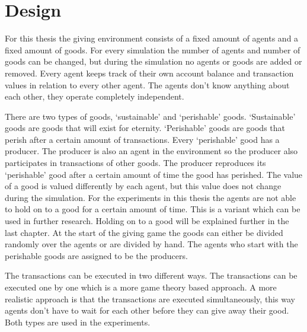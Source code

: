 \documentclass[twoside,openright]{uva-bachelor-thesis}
\begin{document}
\chapter{Design}
For this thesis the giving environment consists of a fixed amount of agents and a fixed amount of goods. For every simulation the number of agents and number of goods can be changed, but during the simulation no agents or goods are added or removed. Every agent keeps track of their own account balance and transaction values in relation to every other agent. The agents don’t know anything about each other, they operate completely independent.

There are two types of goods, ‘sustainable’ and ‘perishable’ goods. ‘Sustainable’ goods are goods that will exist for eternity. ‘Perishable’ goods are goods that perish after a certain amount of transactions. Every ‘perishable’ good has a producer. The producer is also an agent in the environment so the producer also participates in transactions of other goods. The producer reproduces its ‘perishable’ good after a certain amount of time the good has perished. The value of a good is valued differently by each agent, but this value does not change during the simulation. For the experiments in this thesis the agents are not able to hold on to a good for a certain amount of time. This is a variant which can be used in further research. Holding on to a good will be explained further in the last chapter. At the start of the giving game the goods can either be divided randomly over the agents or are divided by hand. The agents who start with the perishable goods are assigned to be the producers.

The transactions can be executed in two different ways. The transactions can be executed one by one which is a more game theory based approach. A more realistic approach is that the transactions are executed simultaneously, this way agents don’t have to wait for each other before they can give away their good. Both types are used in the experiments.
\end{document}
